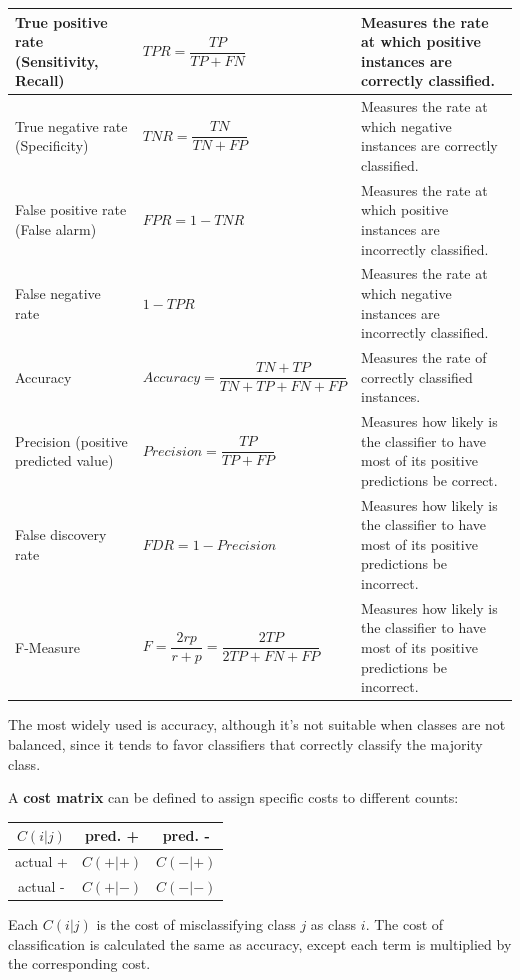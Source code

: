 \bgroup
\def\arraystretch{1.5}%
\begin{table}[ht]
\scriptsize
    \centering
    \begin{tabular}{ 
    | >{\centering\arraybackslash}p{90pt}
    | >{\centering\arraybackslash}p{140pt}
    | >{\centering\arraybackslash}m{100pt} | }
    
    \hline
        True positive rate (Sensitivity, Recall) & $TPR = \dfrac{TP}{TP + FN}$ & Measures the rate at which positive instances are correctly classified. \\
        \hline
        True negative rate (Specificity) & $TNR = \dfrac{TN}{TN + FP}$ & Measures the rate at which negative instances are correctly classified. \\
        \hline
        False positive rate (False alarm) & $FPR = 1 - TNR$ & Measures the rate at which positive instances are incorrectly classified. \\
        \hline
        False negative rate & $1 - TPR$ & Measures the rate at which negative instances are incorrectly classified. \\
        \hline
        Accuracy & $ Accuracy = \dfrac{TN + TP}{TN + TP + FN + FP}$ &  Measures the rate of correctly classified instances. \\
        \hline
        Precision (positive predicted value) & $Precision = \dfrac{TP}{TP + FP}$ & Measures how likely is the classifier to have most of its positive predictions be correct. \\
        \hline
        False discovery rate & $FDR = 1 - Precision$ & Measures how likely is the classifier to have most of its positive predictions be incorrect. \\
        \hline
        F-Measure & $F = \dfrac{2rp}{r+p} = \dfrac{2TP}{2TP + FN + FP}$ & Measures how likely is the classifier to have most of its positive predictions be incorrect. \\
    \hline
    \end{tabular}
\end{table}
\egroup

\clearpage

The most widely used is accuracy, although it's not suitable when classes are not balanced, since it tends to favor classifiers that correctly classify the majority class.

A \textbf{cost matrix} can be defined to assign specific costs to different counts:
\begin{table}[h]
    \centering
    \begin{tabular}{|c|c|c|}
         \hline
        $C(i|j)$ & pred. + & pred. - \\
        \hline
        actual + & $C(+|+)$ & $C(-|+)$\\
        \hline
        actual - & $C(+|-)$ & $C(-|-)$\\
        \hline
    \end{tabular}
\end{table}
Each $C(i|j)$ is the cost of misclassifying class $j$ as class $i$. The cost of classification is calculated the same as accuracy, except each term is multiplied by the corresponding cost.

